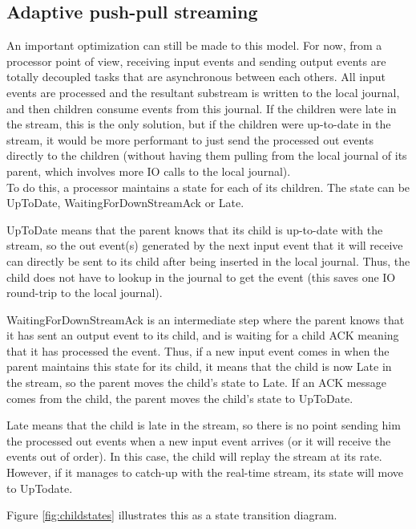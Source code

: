 \subsection{Adaptive push-pull streaming}
\label{sec:adapativepushpull}

An important optimization can still be made to this model. For now, from a processor point of view, receiving input events and sending output events are totally
decoupled tasks that are asynchronous between each others. All input events are processed and the resultant substream is written to the local journal, and then children consume events from this journal. 
If the children were late in the stream, this is the only solution, but if the children were up-to-date in the stream, it would be more performant to just send the processed out events directly to the children (without having them pulling from the local journal of its parent, which involves more IO calls to the local journal).
\\

To do this, a processor maintains a state for each of its children. The state can be UpToDate, WaitingForDownStreamAck or Late.

UpToDate means that the parent knows that its child is up-to-date with the stream, so the out event(s) generated by the next input event that it will receive can 
directly be sent to its child after being inserted in the local journal. Thus, the child does not have to lookup in the journal to get the event (this saves one IO round-trip to the local journal).

WaitingForDownStreamAck is an intermediate step where the parent knows that it has sent an output event to its child, and is waiting for a child ACK meaning that it has
processed the event. Thus, if a new input event comes in when the parent maintains this state
for its child, it means that the child is now Late in the stream, so the parent moves the child's state to Late. If an ACK message comes from the child, the parent moves the
child's state to UpToDate.

Late means that the child is late in the stream, so there is no point sending him the processed out events when a new input event arrives (or it will receive the events out of order).
In this case, the child will replay the stream at its rate. However, if it manages to catch-up with the real-time stream, its state will move to UpTodate.

Figure \ref{fig:childstates} illustrates this as a state transition diagram.

